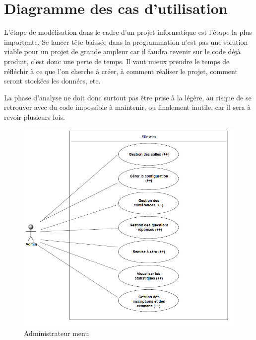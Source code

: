 \chapter{Diagramme des cas d'utilisation}

L'étape de modélisation dans le cadre d'un projet informatique est l'étape la plus importante.
Se lancer tête baissée dans la programmation n'est pas une solution viable pour un projet
de grande ampleur car il faudra revenir sur le code déjà produit, c'est donc une perte de
temps. Il vaut mieux prendre le temps de réfléchir à ce que l'on cherche à créer, à comment
réaliser le projet, comment seront stockées les données, etc.

La phase d'analyse ne doit donc surtout pas être prise à la légère, au risque de se retrouver
avec du code impossible à maintenir, ou finalement inutile, car il sera à revoir plusieurs fois.

    \begin{figure}[h]
        \begin{center}
            \includegraphics[scale=0.85]{images/uml/adminMenu.png} 
        \end{center}

        \caption{Administrateur menu}
        \label{a=Administrateur menu}
    \end{figure}

